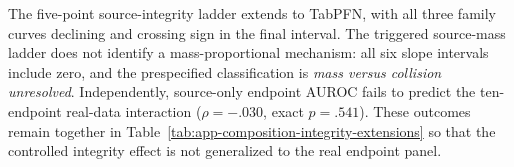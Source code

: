 
The five-point source-integrity ladder extends to TabPFN, with all three
family curves declining and crossing sign in the final interval.  The
triggered source-mass ladder does not identify a mass-proportional mechanism:
all six slope intervals include zero, and the prespecified classification is
\emph{mass versus collision unresolved}.  Independently, source-only endpoint
AUROC fails to predict the ten-endpoint real-data interaction
($\rho=-.030$, exact $p=.541$).  These outcomes remain together in
Table~\ref{tab:app-composition-integrity-extensions} so that the controlled
integrity effect is not generalized to the real endpoint panel.

